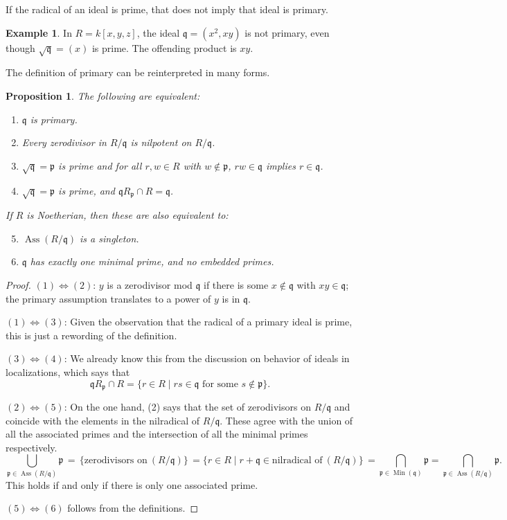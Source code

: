 \documentclass{amsart}[12pt]
\def\Ass{\operatorname{Ass}}
\def\Min{\operatorname{Min}}
\newcommand{\p}{{\mathfrak p}}
\newcommand{\q}{{\mathfrak q}}
\numberwithin{equation}{section}
\theoremstyle{plain} %
\newtheorem{proposition}[equation]{Proposition}
\theoremstyle{definition}
\newtheorem{example}[equation]{Example}
\theoremstyle{remark}
\begin{document}
If the radical of an ideal is prime, that does not imply that ideal is primary.
\begin{example}\label{example radical prime but not primary}
In $R=k[x,y,z]$, the ideal $\q=(x^2,xy)$ is not primary, even though $\sqrt{\q}=(x)$ is prime. The offending product is $xy$.	
\end{example}

The definition of primary can be reinterpreted in many forms.

\begin{proposition}\label{characterization of primary}
The following are equivalent:
	\begin{enumerate}
		\item $\q$ is primary.
		\item Every zerodivisor in $R/\q$ is nilpotent on $R/\q$.
	
		\item $\sqrt{\q} = \p$ is prime and for all $r, w \in R$ with $w\notin \p$, $rw\in \q$ implies $r\in \q$.
		\item $\sqrt{\q}= \p$ is prime, and $\q R_{\p} \cap R = \q$.
	\end{enumerate}
	If $R$ is Noetherian, then these are also equivalent to:
	\begin{enumerate}
	\setcounter{enumi}{4}
		\item $\Ass(R/\q)$ is a singleton.
		\item $\q$ has exactly one minimal prime, and no embedded primes.
		\end{enumerate}
\end{proposition}
\begin{proof}
	$(1) \iff (2)$: $y$ is a zerodivisor mod $\q$ if there is some $x\notin \q$ with $xy\in \q$; the primary assumption translates to a power of $y$ is in $\q$.
	
	
	$(1) \iff (3)$: Given the observation that the radical of a primary ideal is prime, this is just a rewording of the definition.
	
	$(3) \iff (4)$: We already know this from the discussion on behavior of ideals in localizations, which says that
	$$\q R_\p \cap R = \lbrace r \in R \mid rs \in \q \textrm{ for some } s \notin \p \rbrace.$$
	
		$(2) \iff (5)$: On the one hand, (2) says that the set of zerodivisors on $R/\q $ and coincide with the elements in the nilradical of $R/\q$. These agree with the union of all the associated primes and the intersection of all the minimal primes respectively.
	$$\bigcup_{\p \in \Ass(R/\q)} \p \, = \, \{\textrm{zerodivisors on}\  (R/\q)\} \, =  \{ r \in R \mid r + \q \in \textrm{nilradical of} \ (R/\q) \} \, = \bigcap_{\p \in \Min(\q)} \p = \bigcap_{\p \in \Ass(R/\q)} \p.$$
	This holds if and only if there is only one associated prime.
	
	$(5) \iff (6)$ follows from the definitions.
\end{proof}
\end{document}
